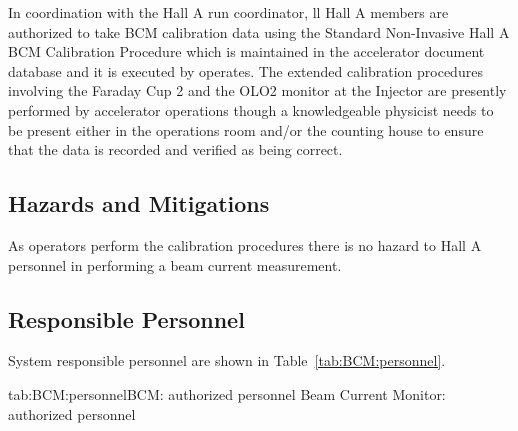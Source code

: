 {\begin{safetyen}{10}{10}

In coordination with the Hall A run coordinator, ll Hall A members are authorized 
to take BCM calibration data using the Standard 
Non-Invasive Hall A BCM Calibration Procedure which is maintained in the accelerator
document database and it is executed by operates. The extended calibration procedures 
involving the Faraday Cup 2 and the OLO2 monitor at the Injector are presently 
performed by accelerator operations though a knowledgeable physicist needs to be present either
in the operations room and/or the counting house to ensure that the data is recorded
and verified as being correct.


\subsection{Hazards and Mitigations}

As operators perform the calibration procedures there is no hazard to Hall A personnel
in performing a beam current measurement.

\subsection{Responsible Personnel}
System responsible personnel are shown in Table~\ref{tab:BCM:personnel}.
\begin{namestab}{tab:BCM:personnel}{BCM: authorized personnel}{%
   Beam Current Monitor: authorized personnel}
\end{namestab}
\end{safetyen}
}
